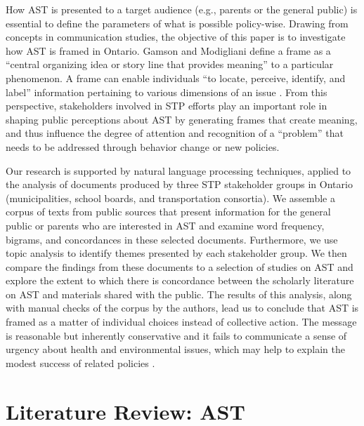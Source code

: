 \documentclass[preprint, 3p,
authoryear]{elsarticle} %
\begin{document}
How AST is presented to a target audience (e.g., parents or the general
public) is essential to define the parameters of what is possible
policy-wise. Drawing from concepts in communication studies, the
objective of this paper is to investigate how AST is framed in Ontario.
Gamson and Modigliani \citeyearpar{gamsonChangingCulture1987} define a
frame as a ``central organizing idea or story line that provides
meaning'' to a particular phenomenon. A frame can enable individuals
``to locate, perceive, identify, and label'' information pertaining to
various dimensions of an issue \citep{goffmanFrameAnalysisEssay1974}.
From this perspective, stakeholders involved in STP efforts play an
important role in shaping public perceptions about AST by generating
frames that create meaning, and thus influence the degree of attention
and recognition of a ``problem'' that needs to be addressed through
behavior change or new policies.

Our research is supported by natural language processing techniques,
applied to the analysis of documents produced by three STP stakeholder
groups in Ontario (municipalities, school boards, and transportation
consortia). We assemble a corpus of texts from public sources that
present information for the general public or parents who are interested
in AST and examine word frequency, bigrams, and concordances in these
selected documents. Furthermore, we use topic analysis to identify
themes presented by each stakeholder group. We then compare the findings
from these documents to a selection of studies on AST and explore the
extent to which there is concordance between the scholarly literature on
AST and materials shared with the public. The results of this analysis,
along with manual checks of the corpus by the authors, lead us to
conclude that AST is framed as a matter of individual choices instead of
collective action. The message is reasonable but inherently conservative
and it fails to communicate a sense of urgency about health and
environmental issues, which may help to explain the modest success of
related policies
\citep{buliungSchoolTravelPlanning2011, mammenSchoolTravelPlanning2014, mammenActiveSchoolTravel2014}.

\hypertarget{literature-review-ast}{%
\section{Literature Review: AST}\label{literature-review-ast}}
\end{document}

